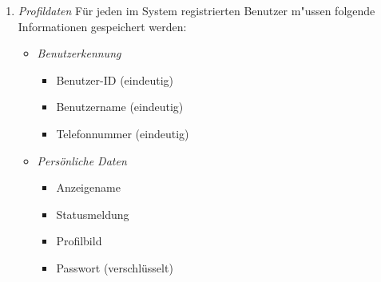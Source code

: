 \documentclass[parskip=full]{scrartcl}
\def\threedigits#1{%
  \ifnum#1<100 0\fi
  \ifnum#1<10 0\fi
  \number#1}
\begin{document}
\begin{enumerate}[label={\textbf{/D\protect\threedigits{\theenumi}0/}}, leftmargin=*]
	\item \textit{Profildaten} \label{Profildaten} Für jeden im System registrierten Benutzer m"ussen folgende Informationen gespeichert werden:
		\begin{itemize}
			\item \textit{Benutzerkennung}
				\begin{itemize}
					\item Benutzer-ID (eindeutig)
					\item Benutzername (eindeutig)
					\item Telefonnummer (eindeutig)
				\end{itemize}
			\item \textit{Persönliche Daten} \label{persönliche Daten} 
			\begin{itemize}
			\item Anzeigename
			\item Statusmeldung
			\item Profilbild
			\item Passwort (verschlüsselt)
		\end{itemize}
		\end{itemize}
	

\end{enumerate}
\end{document}
